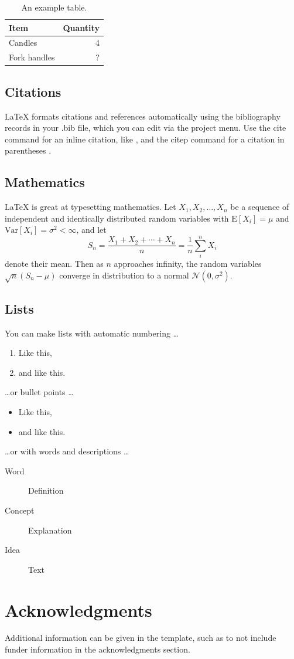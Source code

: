 \documentclass[fleqn,10pt]{olplainarticle}
\begin{document}
\begin{table}[ht]
\centering
\begin{tabular}{l|r}
Item & Quantity \\\hline
Candles & 4 \\
Fork handles & ?  
\end{tabular}
\caption{\label{tab:widgets}An example table.}
\end{table}

\subsection*{Citations}

LaTeX formats citations and references automatically using the bibliography records in your .bib file, which you can edit via the project menu. Use the cite command for an inline citation, like \cite{lees2010theoretical}, and the citep command for a citation in parentheses \citep{lees2010theoretical}.

\subsection*{Mathematics}

\LaTeX{} is great at typesetting mathematics. Let $X_1, X_2, \ldots, X_n$ be a sequence of independent and identically distributed random variables with $\text{E}[X_i] = \mu$ and $\text{Var}[X_i] = \sigma^2 < \infty$, and let
$$S_n = \frac{X_1 + X_2 + \cdots + X_n}{n}
      = \frac{1}{n}\sum_{i}^{n} X_i$$
denote their mean. Then as $n$ approaches infinity, the random variables $\sqrt{n}(S_n - \mu)$ converge in distribution to a normal $\mathcal{N}(0, \sigma^2)$.

\subsection*{Lists}

You can make lists with automatic numbering \dots

\begin{enumerate}[noitemsep] 
\item Like this,
\item and like this.
\end{enumerate}
\dots or bullet points \dots
\begin{itemize}[noitemsep] 
\item Like this,
\item and like this.
\end{itemize}
\dots or with words and descriptions \dots
\begin{description}
\item[Word] Definition
\item[Concept] Explanation
\item[Idea] Text
\end{description}

\section*{Acknowledgments}

Additional information can be given in the template, such as to not include funder information in the acknowledgments section.


\end{document}
